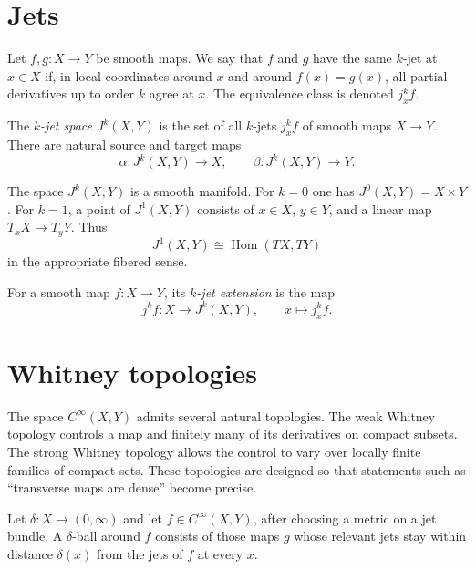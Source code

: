 \section{Jets}
\label{section-jets}

\begin{definition}
\label{definition-jet-equivalence}
Let $f,g:X\to Y$ be smooth maps.  We say
that $f$ and $g$ have the same $k$-jet at
$x\in X$ if, in local coordinates around $x$
and around $f(x)=g(x)$, all partial
derivatives up to order $k$ agree at $x$.
The equivalence class is denoted $j_x^kf$.
\end{definition}

\begin{definition}
\label{definition-jet-space}
The {\it $k$-jet space} $J^k(X,Y)$ is the set
of all $k$-jets $j_x^kf$ of smooth maps
$X\to Y$.
There are natural source and target maps
$$
\alpha:J^k(X,Y)\to X,
\qquad
\beta:J^k(X,Y)\to Y.
$$
\end{definition}

\noindent
The space $J^k(X,Y)$ is a smooth manifold.
For $k=0$ one has $J^0(X,Y)=X\times Y$.
For $k=1$, a point of $J^1(X,Y)$ consists of
$x\in X$, $y\in Y$, and a linear map
$T_xX\to T_yY$.
Thus
$$
J^1(X,Y)
\cong
\operatorname{Hom}(TX,TY)
$$
in the appropriate fibered sense.

\begin{definition}
\label{definition-jet-extension}
For a smooth map $f:X\to Y$, its
{\it $k$-jet extension} is the map
$$
j^kf:X\to J^k(X,Y),
\qquad
x\longmapsto j_x^kf.
$$
\end{definition}

\section{Whitney topologies}
\label{section-whitney-topologies}

\noindent
The space $C^\infty(X,Y)$ admits several
natural topologies.  The weak Whitney
topology controls a map and finitely many
of its derivatives on compact subsets.  The
strong Whitney topology allows the control to
vary over locally finite families of compact
sets.  These topologies are designed so that
statements such as ``transverse maps are
dense'' become precise.

\begin{definition}
\label{definition-delta-ball}
Let $\delta:X\to (0,\infty)$ and let
$f\in C^\infty(X,Y)$, after choosing a
metric on a jet bundle.  A $\delta$-ball
around $f$ consists of those maps $g$ whose
relevant jets stay within distance
$\delta(x)$ from the jets of $f$ at every
$x$.
\end{definition}

